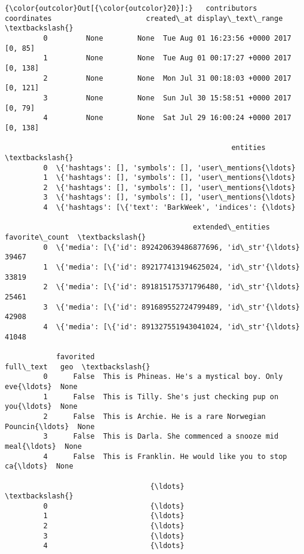 \documentclass[11pt]{article}
\begin{document}
\begin{Verbatim}[commandchars=\\\{\}]
{\color{outcolor}Out[{\color{outcolor}20}]:}   contributors coordinates                      created\_at display\_text\_range  \textbackslash{}
         0         None        None  Tue Aug 01 16:23:56 +0000 2017            [0, 85]   
         1         None        None  Tue Aug 01 00:17:27 +0000 2017           [0, 138]   
         2         None        None  Mon Jul 31 00:18:03 +0000 2017           [0, 121]   
         3         None        None  Sun Jul 30 15:58:51 +0000 2017            [0, 79]   
         4         None        None  Sat Jul 29 16:00:24 +0000 2017           [0, 138]   
         
                                                     entities  \textbackslash{}
         0  \{'hashtags': [], 'symbols': [], 'user\_mentions{\ldots}   
         1  \{'hashtags': [], 'symbols': [], 'user\_mentions{\ldots}   
         2  \{'hashtags': [], 'symbols': [], 'user\_mentions{\ldots}   
         3  \{'hashtags': [], 'symbols': [], 'user\_mentions{\ldots}   
         4  \{'hashtags': [\{'text': 'BarkWeek', 'indices': {\ldots}   
         
                                            extended\_entities  favorite\_count  \textbackslash{}
         0  \{'media': [\{'id': 892420639486877696, 'id\_str'{\ldots}           39467   
         1  \{'media': [\{'id': 892177413194625024, 'id\_str'{\ldots}           33819   
         2  \{'media': [\{'id': 891815175371796480, 'id\_str'{\ldots}           25461   
         3  \{'media': [\{'id': 891689552724799489, 'id\_str'{\ldots}           42908   
         4  \{'media': [\{'id': 891327551943041024, 'id\_str'{\ldots}           41048   
         
            favorited                                          full\_text   geo  \textbackslash{}
         0      False  This is Phineas. He's a mystical boy. Only eve{\ldots}  None   
         1      False  This is Tilly. She's just checking pup on you{\ldots}  None   
         2      False  This is Archie. He is a rare Norwegian Pouncin{\ldots}  None   
         3      False  This is Darla. She commenced a snooze mid meal{\ldots}  None   
         4      False  This is Franklin. He would like you to stop ca{\ldots}  None   
         
                                  {\ldots}                          \textbackslash{}
         0                        {\ldots}                           
         1                        {\ldots}                           
         2                        {\ldots}                           
         3                        {\ldots}                           
         4                        {\ldots}                           
         

\end{Verbatim}
\end{document}
